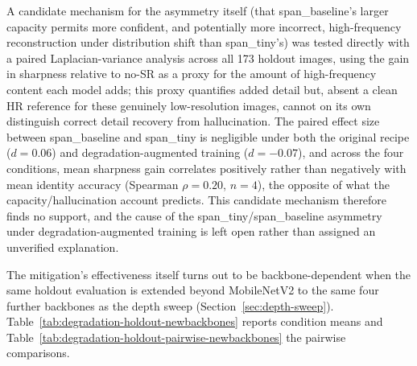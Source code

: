 \documentclass[11pt]{article}
\begin{document}
A candidate mechanism for the asymmetry itself (that span\_baseline's larger capacity permits more confident, and potentially more incorrect, high-frequency reconstruction under distribution shift than span\_tiny's) was tested directly with a paired Laplacian-variance analysis across all 173 holdout images, using the gain in sharpness relative to no-SR as a proxy for the amount of high-frequency content each model adds; this proxy quantifies added detail but, absent a clean HR reference for these genuinely low-resolution images, cannot on its own distinguish correct detail recovery from hallucination. The paired effect size between span\_baseline and span\_tiny is negligible under both the original recipe ($d{=}0.06$) and degradation-augmented training ($d{=}{-}0.07$), and across the four conditions, mean sharpness gain correlates positively rather than negatively with mean identity accuracy (Spearman $\rho{=}0.20$, $n{=}4$), the opposite of what the capacity/hallucination account predicts. This candidate mechanism therefore finds no support, and the cause of the span\_tiny/span\_baseline asymmetry under degradation-augmented training is left open rather than assigned an unverified explanation.

The mitigation's effectiveness itself turns out to be backbone-dependent when the same holdout evaluation is extended beyond MobileNetV2 to the same four further backbones as the depth sweep (Section~\ref{sec:depth-sweep}). Table~\ref{tab:degradation-holdout-newbackbones} reports condition means and Table~\ref{tab:degradation-holdout-pairwise-newbackbones} the pairwise comparisons.

\begin{table}[H]
\centering
\caption{Real low-resolution holdout under degradation-augmented training, four further backbones (identity and gender accuracy, mean $\pm$ std.\ dev., $n{=}5$ seeds each; original MobileNetV2 results in Table~\ref{tab:degradation-holdout}). Gender accuracy uses EarVN1.0's folder-range gender convention (Section~\ref{sec:datasets}), not an independently verified attribute.}
\label{tab:degradation-holdout-newbackbones}
\end{table}
\end{document}
